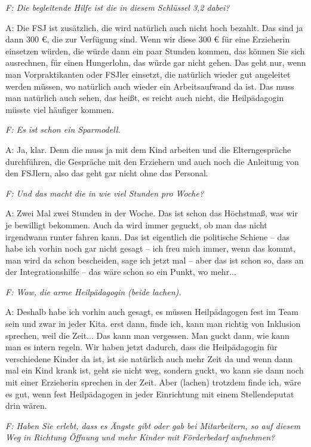 \emph{F: Die begleitende Hilfe ist die in diesem Schlüssel 3,2 dabei?} 

A: Die FSJ ist zusätzlich, die wird natürlich auch nicht hoch bezahlt. Das sind ja dann 300 €, die zur Verfügung sind. Wenn wir diese 300 € für eine Erzieherin einsetzen würden, die würde dann ein paar Stunden kommen, das können Sie sich ausrechnen, für einen Hungerlohn, das würde gar nicht gehen. Das geht nur, wenn man Vorpraktikanten oder FSJler einsetzt, die natürlich wieder gut angeleitet werden müssen, wo natürlich auch wieder ein Arbeitsaufwand da ist. Das muss man natürlich auch sehen, das heißt, es reicht auch nicht, die Heilpädagogin müsste viel häufiger kommen.

\emph{F: Es ist schon ein Sparmodell.}

A: Ja, klar.  
Denn die muss ja mit dem Kind arbeiten und die Elterngespräche durchführen, die Gespräche mit den Erziehern und auch noch die Anleitung von den FSJlern, also das geht gar nicht ohne das Personal.

\emph{F: Und das macht die in wie viel Stunden pro Woche?}

A: Zwei Mal zwei Stunden in der Woche. Das ist schon das Höchstmaß, was wir je bewilligt bekommen. Auch da wird immer geguckt, ob man das nicht irgendwann runter fahren kann. Das ist eigentlich die politische Schiene -- das habe ich vorhin noch gar nicht gesagt -- ich freu mich immer, wenn das kommt, man wird da schon bescheiden, sage ich jetzt mal -- aber das ist schon so, dass an der Integrationshilfe -- das wäre schon so ein Punkt, wo mehr...

\emph{F: Wow, die arme Heilpädagogin (beide lachen).}

A: Deshalb habe ich vorhin auch gesagt, es müssen Heilpädagogen fest im Team sein und zwar in jeder Kita. erst dann, finde ich, kann man richtig von Inklusion sprechen, weil die Zeit... Das kann man vergessen. Man guckt dann, wie kann man es intern regeln. Wir haben jetzt dadurch, dass die Heilpädagogin für verschiedene Kinder da ist, ist sie natürlich auch mehr Zeit da und wenn dann mal ein Kind krank ist, geht sie nicht weg, sondern guckt, wo kann sie dann noch mit einer Erzieherin sprechen in der Zeit. Aber (lachen) trotzdem finde ich, wäre es gut, wenn fest Heilpädagogen in jeder Einrichtung mit einem Stellendeputat drin wären. 

\emph{F: Haben Sie erlebt, dass es Ängste gibt oder gab bei Mitarbeitern, so auf diesem Weg in Richtung Öffnung und mehr Kinder mit Förderbedarf aufnehmen?}

